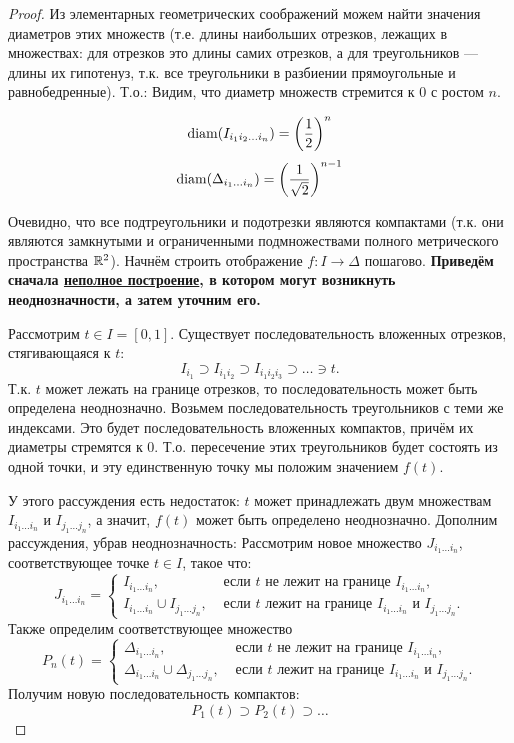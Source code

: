 \begin{proof}
    Из элементарных геометрических соображений можем найти значения диаметров этих множеств (т.е. длины наибольших отрезков, лежащих в множествах: для отрезков это длины самих отрезков, а для треугольников --- длины их гипотенуз, т.к. все треугольники в разбиении прямоугольные и равнобедренные). Т.о.:
    Видим, что диаметр множеств стремится к $0$ с ростом $n$.

    \[
        \operatorname{diam}(I_{i_1 i_2 \ldots i_n}) = \left(\frac{1}{2}\right)^n
    \]
    \[
        \operatorname{diam}(\Delta_{i_1 \ldots i_n}) = \left(\frac{1}{\sqrt{2}}\right)^{n - 1}
    \]

    Очевидно, что все подтреугольники и подотрезки являются компактами (т.к. они являются замкнутыми и ограниченными подмножествами полного метрического пространства $\mathbb{R}^2$).
    Начнём строить отображение $f: I \to \Delta$ пошагово. \textbf{Приведём сначала \underline{неполное построение}, в котором могут возникнуть неоднозначности, а затем уточним его.}

    Рассмотрим $t \in I = [0, 1]$. Существует последовательность вложенных отрезков, стягивающаяся к $t$:
    \[
        I_{i_1} \supset I_{i_1 i_2} \supset I_{i_1 i_2 i_3} \supset \ldots \ni t.
    \]
    Т.к. $t$ может лежать на границе отрезков, то последовательность может быть определена неоднозначно.
    Возьмем последовательность треугольников с теми же индексами. Это будет последовательность вложенных компактов, причём их диаметры стремятся к $0$. Т.о. пересечение этих треугольников будет состоять из одной точки, и эту единственную точку мы положим значением $f(t)$.

    У этого рассуждения есть недостаток: $t$ может принадлежать двум множествам $I_{i_1 \ldots i_n}$ и $I_{j_1 \ldots j_n}$, а значит, $f(t)$ может быть определено неоднозначно. Дополним рассуждения, убрав неоднозначность:
    Рассмотрим новое множество $J_{i_1 \ldots i_n}$, соответствующее точке $t \in I$, такое что: 
    \[
        J_{i_1 \ldots i_n} = 
        \begin{cases}
            I_{i_1 \ldots i_n}, & \text{ если $t$ не лежит на границе $I_{i_1 \ldots i_n}$}, \\
            I_{i_1 \ldots i_n} \cup I_{j_1 \ldots j_n}, & \text{ если $t$ лежит на границе $I_{i_1 \ldots i_n}$ и $I_{j_1 \ldots j_n}$}.
        \end{cases}
    \]
    Также определим соответствующее множество 
    \[
        P_n(t) =
        \begin{cases}
            \Delta_{i_1 \ldots i_n}, & \text{ если $t$ не лежит на границе $I_{i_1 \ldots i_n}$}, \\
            \Delta_{i_1 \ldots i_n} \cup \Delta_{j_1 \ldots j_n}, & \text{ если $t$ лежит на границе $I_{i_1 \ldots i_n}$ и $I_{j_1 \ldots j_n}$}.
        \end{cases}
    \]
    Получим новую последовательность компактов:
    \[
        P_1(t) \supset P_2(t) \supset \ldots
    \]


\end{proof}
